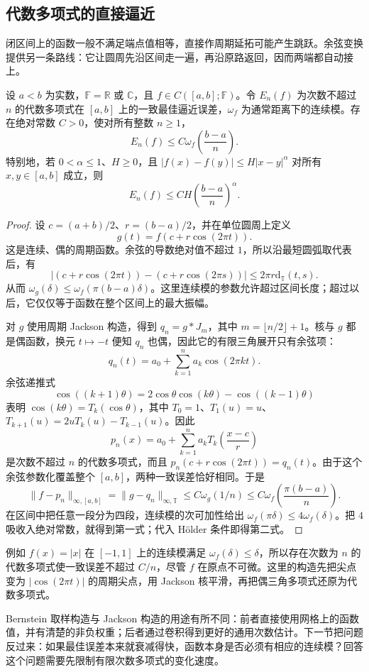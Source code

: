\subsection{代数多项式的直接逼近}
\label{b2:subsec:approximation-jackson-algebraic}

闭区间上的函数一般不满足端点值相等，直接作周期延拓可能产生跳跃。余弦变换提供另一条路线：它让圆周先沿区间走一遍，再沿原路返回，因而两端都自动接上。

\begin{theorem}
\label{b2:thm:approximation-jackson-algebraic}
设 \(a<b\) 为实数，\(\mathbb F=\mathbb R\) 或 \(\mathbb C\)，且 \(f\in C([a,b];\mathbb F)\)。令 \(E_n(f)\) 为次数不超过 \(n\) 的代数多项式在 \([a,b]\) 上的一致最佳逼近误差，\(\omega_f\) 为通常距离下的连续模。存在绝对常数 \(C>0\)，使对所有整数 \(n\geq1\)，
\[
 E_n(f)\leq C\omega_f\left(\frac{b-a}{n}\right).
\]
特别地，若 \(0<\alpha\leq1\)、\(H\geq0\)，且 \(|f(x)-f(y)|\leq H|x-y|^\alpha\) 对所有 \(x,y\in[a,b]\) 成立，则
\[
 E_n(f)\leq CH\left(\frac{b-a}{n}\right)^\alpha.
\]
\end{theorem}
\begin{proof}
设 \(c=(a+b)/2\)、\(r=(b-a)/2\)，并在单位圆周上定义
\[
 g(t)=f(c+r\cos(2\pi t)).
\]
这是连续、偶的周期函数。余弦的导数绝对值不超过 \(1\)，所以沿最短圆弧取代表后，有
\[
 |(c+r\cos(2\pi t))-(c+r\cos(2\pi s))|
 \leq2\pi r\mathrm d_{\mathbb T}(t,s).
\]
从而 \(\omega_g(\delta)\leq\omega_f(\pi(b-a)\delta)\)。这里连续模的参数允许超过区间长度；超过以后，它仅仅等于函数在整个区间上的最大振幅。

对 \(g\) 使用周期 Jackson 构造，得到 \(q_n=g*J_m\)，其中 \(m=\lfloor n/2\rfloor+1\)。核与 \(g\) 都是偶函数，换元 \(t\mapsto-t\) 便知 \(q_n\) 也偶，因此它的有限三角展开只有余弦项：
\[
 q_n(t)=a_0+\sum_{k=1}^na_k\cos(2\pi kt).
\]
余弦递推式
\[
 \cos((k+1)\theta)=2\cos\theta\cos(k\theta)-\cos((k-1)\theta)
\]
表明 \(\cos(k\theta)=T_k(\cos\theta)\)，其中 \(T_0=1\)、\(T_1(u)=u\)、\(T_{k+1}(u)=2uT_k(u)-T_{k-1}(u)\)。因此
\[
 p_n(x)=a_0+\sum_{k=1}^na_kT_k\left(\frac{x-c}{r}\right)
\]
是次数不超过 \(n\) 的代数多项式，而且 \(p_n(c+r\cos(2\pi t))=q_n(t)\)。由于这个余弦参数化覆盖整个 \([a,b]\)，两种一致误差恰好相同。于是
\[
 \lVert f-p_n\rVert_{\infty,[a,b]}
 =\lVert g-q_n\rVert_{\infty,\mathbb T}
 \leq C\omega_g(1/n)
 \leq C\omega_f\left(\frac{\pi(b-a)}n\right).
\]
在区间中把任意一段分为四段，连续模的次可加性给出
\(\omega_f(\pi\delta)\leq4\omega_f(\delta)\)。把 \(4\) 吸收入绝对常数，就得到第一式；代入 Hölder 条件即得第二式。
\end{proof}

例如 \(f(x)=|x|\) 在 \([-1,1]\) 上的连续模满足 \(\omega_f(\delta)\leq\delta\)，所以存在次数为 \(n\) 的代数多项式使一致误差不超过 \(C/n\)，尽管 \(f\) 在原点不可微。这里的构造先把尖点变为 \(|\cos(2\pi t)|\) 的周期尖点，用 Jackson 核平滑，再把偶三角多项式还原为代数多项式。

\ProseParagraphBreak

Bernstein 取样构造与 Jackson 构造的用途有所不同：前者直接使用网格上的函数值，并有清楚的非负权重；后者通过卷积得到更好的通用次数估计。下一节把问题反过来：如果最佳误差本来就衰减得快，函数本身是否必须有相应的连续模？回答这个问题需要先限制有限次数多项式的变化速度。
